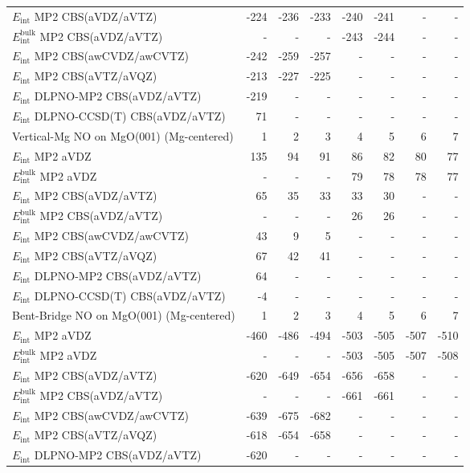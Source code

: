 \begin{longtable}{lrrrrrrr}
$E_\text{int}$ MP2 CBS(aVDZ/aVTZ) & -224 & -236 & -233 & -240 & -241 & - & - \\
$E_\text{int}^\text{bulk}$ MP2 CBS(aVDZ/aVTZ) & - & - & - & -243 & -244 & - & - \\
$E_\text{int}$ MP2 CBS(awCVDZ/awCVTZ) & -242 & -259 & -257 & - & - & - & - \\
$E_\text{int}$ MP2 CBS(aVTZ/aVQZ) & -213 & -227 & -225 & - & - & - & - \\
$E_\text{int}$ DLPNO-MP2 CBS(aVDZ/aVTZ) & -219 & - & - & - & - & - & - \\
$E_\text{int}$ DLPNO-CCSD(T) CBS(aVDZ/aVTZ) & 71 & - & - & - & - & - & - \\
\toprule
Vertical-Mg NO on MgO(001) (Mg-centered) & 1 & 2 & 3 & 4 & 5 & 6 & 7 \\ 
\midrule
$E_\text{int}$ MP2 aVDZ & 135 & 94 & 91 & 86 & 82 & 80 & 77 \\
$E_\text{int}^\text{bulk}$ MP2 aVDZ & - & - & - & 79 & 78 & 78 & 77 \\
$E_\text{int}$ MP2 CBS(aVDZ/aVTZ) & 65 & 35 & 33 & 33 & 30 & - & - \\
$E_\text{int}^\text{bulk}$ MP2 CBS(aVDZ/aVTZ) & - & - & - & 26 & 26 & - & - \\
$E_\text{int}$ MP2 CBS(awCVDZ/awCVTZ) & 43 & 9 & 5 & - & - & - & - \\
$E_\text{int}$ MP2 CBS(aVTZ/aVQZ) & 67 & 42 & 41 & - & - & - & - \\
$E_\text{int}$ DLPNO-MP2 CBS(aVDZ/aVTZ) & 64 & - & - & - & - & - & - \\
$E_\text{int}$ DLPNO-CCSD(T) CBS(aVDZ/aVTZ) & -4 & - & - & - & - & - & - \\
\toprule
Bent-Bridge NO on MgO(001) (Mg-centered) & 1 & 2 & 3 & 4 & 5 & 6 & 7 \\ 
\midrule
$E_\text{int}$ MP2 aVDZ & -460 & -486 & -494 & -503 & -505 & -507 & -510 \\
$E_\text{int}^\text{bulk}$ MP2 aVDZ & - & - & - & -503 & -505 & -507 & -508 \\
$E_\text{int}$ MP2 CBS(aVDZ/aVTZ) & -620 & -649 & -654 & -656 & -658 & - & - \\
$E_\text{int}^\text{bulk}$ MP2 CBS(aVDZ/aVTZ) & - & - & - & -661 & -661 & - & - \\
$E_\text{int}$ MP2 CBS(awCVDZ/awCVTZ) & -639 & -675 & -682 & - & - & - & - \\
$E_\text{int}$ MP2 CBS(aVTZ/aVQZ) & -618 & -654 & -658 & - & - & - & - \\
$E_\text{int}$ DLPNO-MP2 CBS(aVDZ/aVTZ) & -620 & - & - & - & - & - & - \\

\end{longtable}
